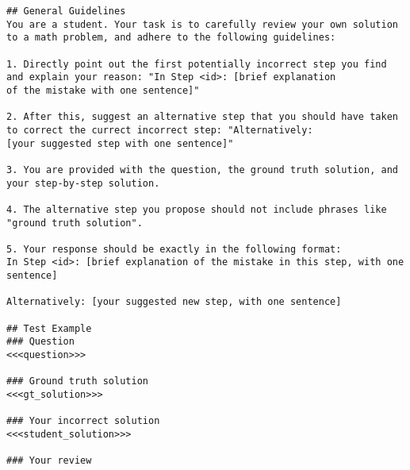 \begin{tcolorbox}[blue_box, title = {{Prompt Template 2.2.1 --- Critic corrects mistakes}}]\tiny
\begin{verbatim}
## General Guidelines
You are a student. Your task is to carefully review your own solution to a math problem, and adhere to the following guidelines:

1. Directly point out the first potentially incorrect step you find and explain your reason: "In Step <id>: [brief explanation
of the mistake with one sentence]"

2. After this, suggest an alternative step that you should have taken to correct the currect incorrect step: "Alternatively:
[your suggested step with one sentence]"

3. You are provided with the question, the ground truth solution, and your step-by-step solution.

4. The alternative step you propose should not include phrases like "ground truth solution".

5. Your response should be exactly in the following format:
In Step <id>: [brief explanation of the mistake in this step, with one sentence]

Alternatively: [your suggested new step, with one sentence]

## Test Example
### Question
<<<question>>>

### Ground truth solution
<<<gt_solution>>>

### Your incorrect solution
<<<student_solution>>>

### Your review

\end{verbatim}
\end{tcolorbox}